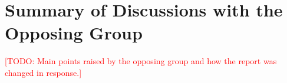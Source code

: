 \documentclass[conference]{IEEEtran}
\newcommand{\todo}[1]{\textcolor{red}{[TODO: #1]}}
\begin{document}
\section{Summary of Discussions with the Opposing Group}
\todo{Main points raised by the opposing group and how the report was changed in response.}




\end{document}
